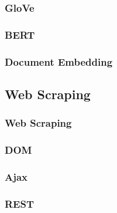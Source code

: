 \subsubsection{GloVe}
\subsubsection{BERT}
\subsubsection{Document Embedding}

\subsection{Web Scraping}
\subsubsection{Web Scraping}
\subsubsection{DOM}
\subsubsection{Ajax}
\subsubsection{REST}
